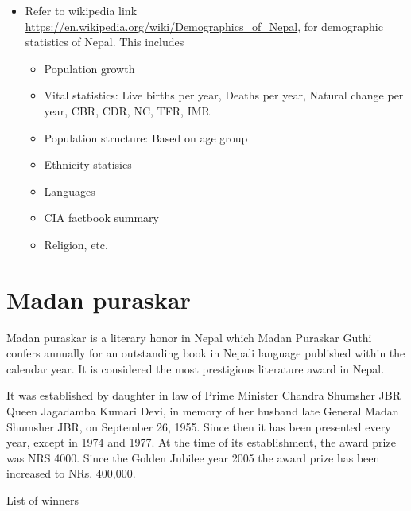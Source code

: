 \documentclass[
  openany]{book}
\providecommand{\tightlist}{%
  \setlength{\itemsep}{0pt}\setlength{\parskip}{0pt}}
\begin{document}
\begin{itemize}
\tightlist
\item
  Refer to wikipedia link \url{https://en.wikipedia.org/wiki/Demographics_of_Nepal}, for demographic statistics of Nepal. This includes

  \begin{itemize}
  \tightlist
  \item
    Population growth
  \item
    Vital statistics: Live births per year, Deaths per year, Natural change per year, CBR, CDR, NC, TFR, IMR
  \item
    Population structure: Based on age group
  \item
    Ethnicity statisics
  \item
    Languages
  \item
    CIA factbook summary
  \item
    Religion, etc.
  \end{itemize}
\end{itemize}

\hypertarget{madan-puraskar}{%
\section{Madan puraskar}\label{madan-puraskar}}

Madan puraskar is a literary honor in Nepal which Madan Puraskar Guthi confers annually for an outstanding book in Nepali language published within the calendar year. It is considered the most prestigious literature award in Nepal.

It was established by daughter in law of Prime Minister Chandra Shumsher JBR Queen Jagadamba Kumari Devi, in memory of her husband late General Madan Shumsher JBR, on September 26, 1955. Since then it has been presented every year, except in 1974 and 1977. At the time of its establishment, the award prize was NRS 4000. Since the Golden Jubilee year 2005 the award prize has been increased to NRs. 400,000.

List of winners

\begingroup\fontsize{8}{10}\selectfont
\end{document}
